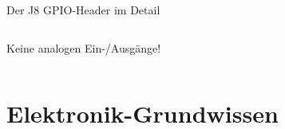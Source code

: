 {\begin{frame}{Der J8 GPIO-Header im Detail}
\begin{columns}
            \begin{alertblock}{Keine analogen Ein-/Ausgänge!}
            \end{alertblock}
        \end{columns}
\end{frame}
}

{

    \begin{frame}[plain]
    \end{frame}
}

\section{Elektronik-Grundwissen}

